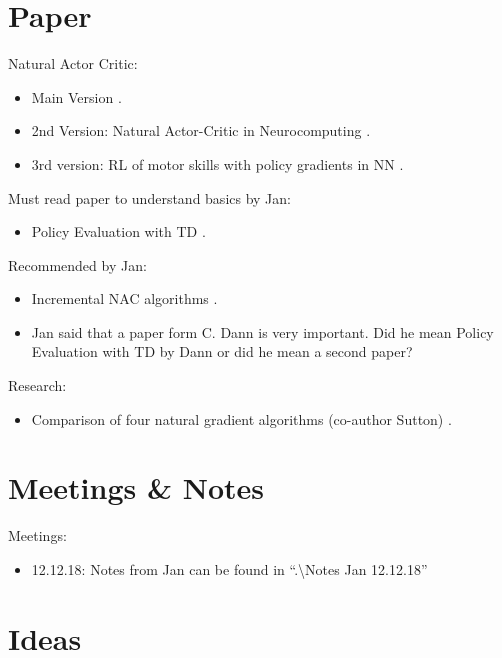 \newpage
\section{Paper}
Natural Actor Critic:
\begin{itemize}
	\item Main Version \cite{peters2005natural}.
	\item 2nd Version: Natural Actor-Critic in Neurocomputing \cite{peters2008natural}.
	\item 3rd version: RL of motor skills with policy gradients in NN \cite{peters2008reinforcement}.
\end{itemize}

\noindent Must read paper to understand basics by Jan:
\begin{itemize}
	\item Policy Evaluation with TD \cite{dann2014policy}.
\end{itemize}

\noindent Recommended by Jan:
\begin{itemize}
	\item Incremental NAC algorithms \cite{bhatnagar2008incremental}.
	\item Jan said that a paper form C. Dann is very important. Did he mean Policy Evaluation with TD by Dann or did he mean a second paper?
\end{itemize}

\noindent Research:
\begin{itemize}
	\item Comparison of four natural gradient algorithms (co-author Sutton) \cite{bhatnagar2009natural}.
\end{itemize}

\section{Meetings \& Notes}

Meetings:
\begin{itemize}
	\item 12.12.18: Notes from Jan can be found in ``.\textbackslash Notes Jan 12.12.18''
\end{itemize}


\section{Ideas}
